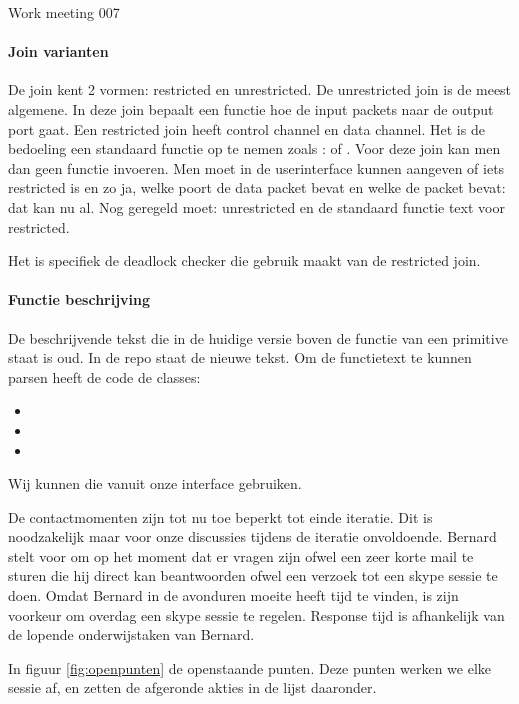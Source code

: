 \documentclass[a4paper,final]{article}
\begin{document}
\begin{Minutes}{Work meeting 007}
\paragraph{Join varianten} De join kent 2 vormen: restricted en unrestricted. De
unrestricted join is de meest algemene. In deze join bepaalt een functie hoe
de input packets naar de output port gaat. Een restricted join heeft \een control
channel en \een data channel. Het is de bedoeling een standaard functie op te 
nemen zoals :  of . Voor deze join kan men dan 
geen functie invoeren. Men moet in de userinterface kunnen aangeven of iets 
restricted is en zo ja, welke poort de data packet bevat en welke de 
 packet bevat: dat kan nu al. Nog geregeld moet: unrestricted en de standaard
functie text voor restricted. 

Het is specifiek de deadlock checker die gebruik maakt van de restricted join.

\paragraph{Functie beschrijving} De beschrijvende tekst die in de huidige versie boven
de functie van een primitive staat is oud. In de \svn repo staat de nieuwe tekst.
Om de functietext te kunnen parsen heeft de \vt code de classes:

\begin{itemize}
	\item {}
	\item {}
	\item {}
\end{itemize}

Wij kunnen die vanuit onze interface gebruiken.


De contactmomenten zijn tot nu toe beperkt tot einde iteratie. Dit is noodzakelijk
maar voor onze discussies tijdens de iteratie onvoldoende. Bernard stelt voor om
op het moment dat er vragen zijn ofwel een zeer korte mail te sturen die hij direct 
kan beantwoorden ofwel een verzoek tot een skype sessie te doen. Omdat Bernard
in de avonduren moeite heeft tijd te vinden, is zijn voorkeur om overdag een skype 
sessie te regelen. Response tijd is afhankelijk van de lopende onderwijstaken van 
Bernard.


In figuur \ref{fig:openpunten} de openstaande punten. Deze punten werken we elke sessie af, en zetten de 
afgeronde akties in de lijst daaronder.


\end{Minutes}
\end{document}
